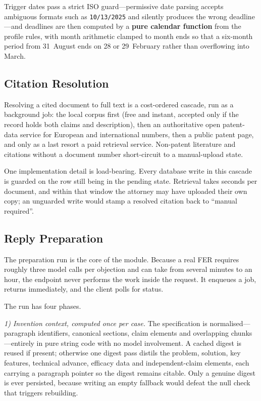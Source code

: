 \documentclass[conference]{IEEEtran}
\newcommand{\code}[1]{\texttt{\small #1}}
\begin{document}
Trigger dates pass a strict ISO guard---permissive date parsing accepts ambiguous formats such as \code{10/13/2025} and silently produces the wrong deadline---and deadlines are then computed by a \textbf{pure calendar function} from the profile rules, with month arithmetic clamped to month ends so that a six-month period from 31~August ends on 28 or 29~February rather than overflowing into March.

\subsection{Citation Resolution}

Resolving a cited document to full text is a cost-ordered cascade, run as a background job: the local corpus first (free and instant, accepted only if the record holds both claims and description), then an authoritative open patent-data service for European and international numbers, then a public patent page, and only as a last resort a paid retrieval service. Non-patent literature and citations without a document number short-circuit to a manual-upload state.

One implementation detail is load-bearing. Every database write in this cascade is guarded on the row still being in the pending state. Retrieval takes seconds per document, and within that window the attorney may have uploaded their own copy; an unguarded write would stamp a resolved citation back to ``manual required''.

\subsection{Reply Preparation}

The preparation run is the core of the module. Because a real FER requires roughly three model calls per objection and can take from several minutes to an hour, the endpoint never performs the work inside the request. It enqueues a job, returns immediately, and the client polls for status.

The run has four phases.

\emph{1) Invention context, computed once per case.} The specification is normalised---paragraph identifiers, canonical sections, claim elements and overlapping chunks---entirely in pure string code with no model involvement. A cached digest is reused if present; otherwise one digest pass distils the problem, solution, key features, technical advance, efficacy data and independent-claim elements, each carrying a paragraph pointer so the digest remains citable. Only a genuine digest is ever persisted, because writing an empty fallback would defeat the null check that triggers rebuilding.
\end{document}
